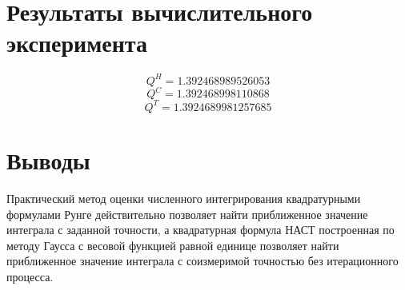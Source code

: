 \documentclass{article}
\begin{document}
\section*{Результаты вычислительного эксперимента}
\[Q^{H} = 1.392468989526053\]
\[Q^{C} = 1.392468998110868\]
\[Q^{T} = 1.3924689981257685\]
\section*{Выводы}
Практический метод оценки численного интегрирования квадратурными формулами Рунге
действительно позволяет найти приближенное значение интеграла с заданной точности,
а квадратурная формула НАСТ построенная по методу Гаусса с весовой функцией равной единице
позволяет найти приближенное значение интеграла с соизмеримой точностью
без итерационного процесса.
\end{document}
